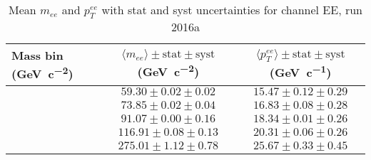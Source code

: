 \begin{table}[ht]
  \centering
  \caption{Mean $m_{ee}$ and $p_T^{ee}$ with stat and syst uncertainties for channel EE, run 2016a}
  \label{tab:mean_ee_2016a}
  \begin{tabular}{@{} l c c @{}}
    \toprule
    Mass bin (\si{\GeV\per c^2}) & $\langle m_{ee}\rangle \pm \text{stat} \pm \text{syst}$ (\si{\GeV\per c^2}) & $\langle p_T^{ee}\rangle \pm \text{stat} \pm \text{syst}$ (\si{\GeV\per c}) \\
    \midrule
    [55, 64] & $59.30 \pm 0.02 \pm 0.02$ & $15.47 \pm 0.12 \pm 0.29$ \\
    [64, 81] & $73.85 \pm 0.02 \pm 0.04$ & $16.83 \pm 0.08 \pm 0.28$ \\
    [81, 101] & $91.07 \pm 0.00 \pm 0.16$ & $18.34 \pm 0.01 \pm 0.26$ \\
    [101, 200] & $116.91 \pm 0.08 \pm 0.13$ & $20.31 \pm 0.06 \pm 0.26$ \\
    [200, 1000] & $275.01 \pm 1.12 \pm 0.78$ & $25.67 \pm 0.33 \pm 0.45$ \\
    \bottomrule
  \end{tabular}
\end{table}